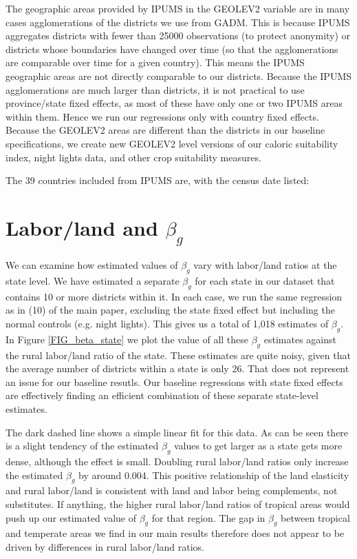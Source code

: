 \documentclass[11pt]{article}
\begin{document}
The geographic areas provided by IPUMS in the GEOLEV2 variable are in many cases agglomerations of the districts we use from GADM. This is because IPUMS aggregates districts with fewer than 25000 observations (to protect anonymity) or districts whose boundaries have changed over time (so that the agglomerations are comparable over time for a given country). This means the IPUMS geographic areas are not directly comparable to our districts. Because the IPUMS agglomerations are much larger than districts, it is not practical to use province/state fixed effects, as most of these have only one or two IPUMS areas within them. Hence we run our regressions only with country fixed effects. Because the GEOLEV2 areas are different than the districts in our baseline specifications, we create new GEOLEV2 level versions of our caloric suitability index, night lights data, and other crop suitability measures. 

The 39 countries included from IPUMS are, with the census date listed: 
 

\section{Labor/land and $\beta_g$}
We can examine how estimated values of $\beta_g$ vary with labor/land ratios at the state level. We have estimated a separate $\beta_g$ for each state in our dataset that contains 10 or more districts within it. In each case, we run the same regression as in (10) of the main paper, excluding the state fixed effect but including the normal controls (e.g. night lights). This gives us a total of 1,018 estimates of $\beta_g$. In Figure \ref{FIG_beta_state} we plot the value of all these $\beta_g$ estimates against the rural labor/land ratio of the state. These estimates are quite noisy, given that the average number of districts within a state is only 26. That does not represent an issue for our baseline resutls. Our baseline regressions with state fixed effects are effectively finding an efficient combination of these separate state-level estimates. 

The dark dashed line shows a simple linear fit for this data. As can be seen there is a slight tendency of the estimated $\beta_g$ values to get larger as a state gets more dense, although the effect is small. Doubling rural labor/land ratios only increase the estimated $\beta_g$ by around 0.004. This positive relationship of the land elasticity and rural labor/land is consistent with land and labor being complements, not substitutes. If anything, the higher rural labor/land ratios of tropical areas would push up our estimated value of $\beta_g$ for that region. The gap in $\beta_g$ between tropical and temperate areas we find in our main results therefore does not appear to be driven by differences in rural labor/land ratios. 
\end{document}
